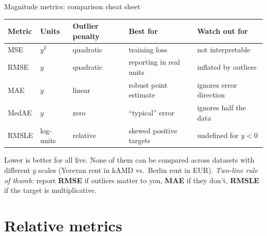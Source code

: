 \documentclass[aspectratio=169]{beamer}
\begin{document}
\begin{frame}{Magnitude metrics: comparison cheat sheet}
  \begin{center}\small
    \begin{tabular}{lllll}
      Metric & Units & Outlier penalty & Best for & Watch out for \\ \hline
      MSE   & $y^2$       & quadratic       & training loss            & not interpretable \\
      RMSE  & $y$         & quadratic       & reporting in real units  & inflated by outliers \\
      MAE   & $y$         & linear          & robust point estimate    & ignores error direction \\
      MedAE & $y$         & zero            & ``typical'' error        & ignores half the data \\
      RMSLE & log-units   & relative        & skewed positive targets  & undefined for $y < 0$ \\
    \end{tabular}
  \end{center}
  \vfill
  Lower is better for all five. None of them can be compared across datasets with different $y$ scales (Yerevan rent in kAMD vs.\ Berlin rent in EUR).
  \vfill
  \footnotesize \emph{Two-line rule of thumb:} report \textbf{RMSE} if outliers matter to you, \textbf{MAE} if they don't, \textbf{RMSLE} if the target is multiplicative.
\end{frame}

\section{Relative metrics}
\end{document}
